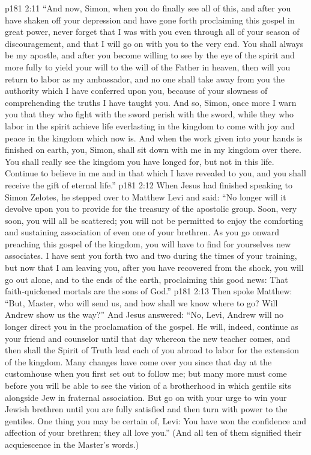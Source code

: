 \pc \vs p181 2:11 \textcolor{ubdarkred}{“And now, Simon, when you do finally see all of this, and after you have shaken off your depression and have gone forth proclaiming this gospel in great power, never forget that I was with you even through all of your season of discouragement, and that I will go on with you to the very end. You shall always be my apostle, and after you become willing to see by the eye of the spirit and more fully to yield your will to the will of the Father in heaven, then will you return to labor as my ambassador, and no one shall take away from you the authority which I have conferred upon you, because of your slowness of comprehending the truths I have taught you. And so, Simon, once more I warn you that they who fight with the sword perish with the sword, while they who labor in the spirit achieve life everlasting in the kingdom to come with joy and peace in the kingdom which now is. And when the work given into your hands is finished on earth, you, Simon, shall sit down with me in my kingdom over there. You shall really see the kingdom you have longed for, but not in this life. Continue to believe in me and in that which I have revealed to you, and you shall receive the gift of eternal life.”}
\pc \vs p181 2:12 When Jesus had finished speaking to Simon Zelotes, he stepped over to Matthew Levi and said: \textcolor{ubdarkred}{“No longer will it devolve upon you to provide for the treasury of the apostolic group. Soon, very soon, you will all be scattered; you will not be permitted to enjoy the comforting and sustaining association of even one of your brethren. As you go onward preaching this gospel of the kingdom, you will have to find for yourselves new associates. I have sent you forth two and two during the times of your training, but now that I am leaving you, after you have recovered from the shock, you will go out alone, and to the ends of the earth, proclaiming this good news: That faith\hyp{}quickened mortals are the sons of God.”}
\vs p181 2:13 Then spoke Matthew: “But, Master, who will send us, and how shall we know where to go? Will Andrew show us the way?” And Jesus answered: \textcolor{ubdarkred}{“No, Levi, Andrew will no longer direct you in the proclamation of the gospel. He will, indeed, continue as your friend and counselor until that day whereon the new teacher comes, and then shall the Spirit of Truth lead each of you abroad to labor for the extension of the kingdom. Many changes have come over you since that day at the customhouse when you first set out to follow me; but many more must come before you will be able to see the vision of a brotherhood in which gentile sits alongside Jew in fraternal association. But go on with your urge to win your Jewish brethren until you are fully satisfied and then turn with power to the gentiles. One thing you may be certain of, Levi: You have won the confidence and affection of your brethren; they all love you.”} (And all ten of them signified their acquiescence in the Master’s words.)
